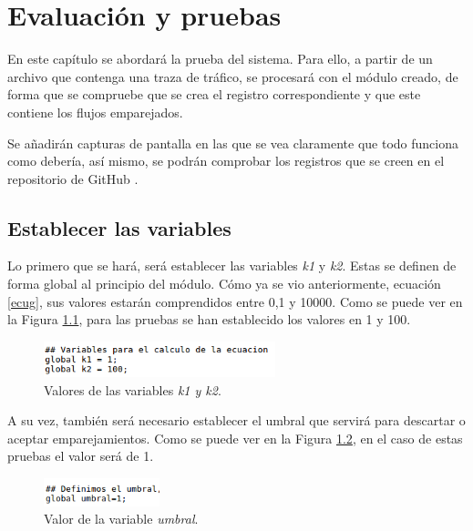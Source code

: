 \chapter{Evaluación y pruebas}\label{evaluacion}

En este capítulo se abordará la prueba del sistema. Para ello, a partir de un archivo que contenga una traza de tráfico, se procesará 
con el módulo creado, de forma que se compruebe que se crea el registro correspondiente y que este contiene los flujos emparejados.

\intro Se añadirán capturas de pantalla en las que se vea claramente que todo funciona como debería, así mismo, se podrán comprobar 
los registros que se creen en el repositorio de GitHub \citep{repo}.

\section{Establecer las variables}

Lo primero que se hará, será establecer las variables \textit{k1} y \textit{k2}. Estas se definen de forma global al principio 
del módulo. Cómo ya se vio anteriormente, ecuación \ref{ecug}, sus valores estarán comprendidos entre 0,1 y 10000. Como se puede ver 
en la Figura \ref{fig.variables}, para las pruebas se han establecido los valores en 1 y 100.

\begin{figure}[H]
  \includegraphics[width=0.6\textwidth]{imagenes/variables.png}
  \centering
  \caption{Valores de las variables \textit{k1 y k2}.}\label{fig.variables}
\end{figure}

\intro A su vez, también será necesario establecer el umbral que servirá para descartar o aceptar emparejamientos. Como se puede ver en la Figura \ref{fig.definirumbral}, en el caso de estas pruebas el valor será de 1.

\begin{figure}[H]
  \includegraphics[width=0.3\textwidth]{imagenes/definirumbral.png}
  \centering
  \caption{Valor de la variable \textit{umbral}.}\label{fig.definirumbral}
\end{figure}


